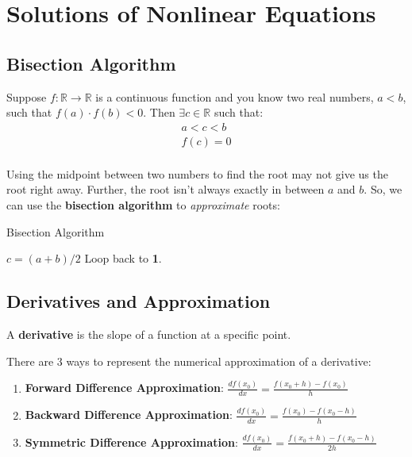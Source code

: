\setcounter{chapter}{10}
\setcounter{lecture}{17}
\chapter{Solutions of Nonlinear Equations}
\section{Bisection Algorithm}

\begin{theorem}
	Suppose \(f: \mathbb{R} \to \mathbb{R}\) is a continuous function and you know two real numbers, \(a < b\), such that \(f(a) \cdot f(b) < 0\). Then \(\exists c \in \mathbb{R}\) such that:
	\begin{align*}
		a < c < b \\
		f(c) = 0 \\
	\end{align*} 
\end{theorem}

Using the midpoint between two numbers to find the root may not give us the root right away. Further, the root isn't always exactly in between \(a\) and \(b\). So, we can use the \textbf{bisection algorithm} to \emph{approximate} roots:

\begin{algorithm}[H]\label{BisectionAlgorithm}
	\DontPrintSemicolon
	\caption{Bisection Algorithm}
	\(c = (a + b) / 2\)
	Loop back to \textbf{1}.
\end{algorithm}

\section{Derivatives and Approximation}

\begin{definition}[Derivative]
	A \textbf{derivative} is the slope of a function at a specific point.
\end{definition}

There are 3 ways to represent the numerical approximation of a derivative:
\begin{enumerate}
	\item \textbf{Forward Difference Approximation}: \(\frac{df(x_0)}{dx} = \frac{f(x_0 + h) - f(x_0)}{h}\)
	\item \textbf{Backward Difference Approximation}: \(\frac{df(x_0)}{dx} = \frac{f(x_0) - f(x_0 - h)}{h}\)
	\item \textbf{Symmetric Difference Approximation}: \(\frac{df(x_0)}{dx} = \frac{f(x_0 + h) - f(x_0 - h)}{2h}\)  
\end{enumerate}

